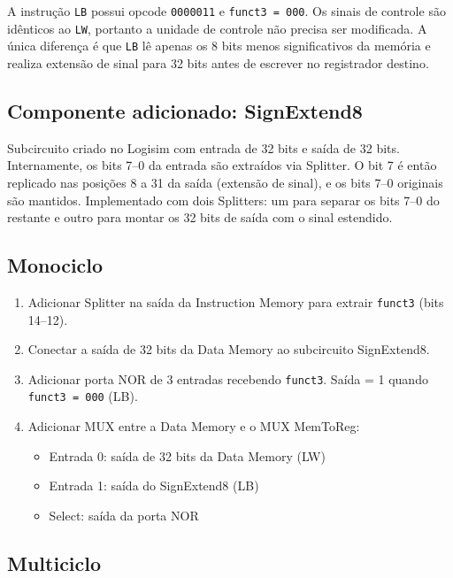 \documentclass{article}
\begin{document}
A instrução \texttt{LB} possui opcode \texttt{0000011} e \texttt{funct3 = 000}. Os sinais de controle são idênticos ao \texttt{LW}, portanto a unidade de controle não precisa ser modificada. A única diferença é que \texttt{LB} lê apenas os 8 bits menos significativos da memória e realiza extensão de sinal para 32 bits antes de escrever no registrador destino.

\subsection*{Componente adicionado: SignExtend8}

Subcircuito criado no Logisim com entrada de 32 bits e saída de 32 bits. Internamente, os bits 7--0 da entrada são extraídos via Splitter. O bit 7 é então replicado nas posições 8 a 31 da saída (extensão de sinal), e os bits 7--0 originais são mantidos. Implementado com dois Splitters: um para separar os bits 7--0 do restante e outro para montar os 32 bits de saída com o sinal estendido.

\subsection*{Monociclo}

\begin{enumerate}
    \item Adicionar Splitter na saída da Instruction Memory para extrair \texttt{funct3} (bits 14--12).
    \item Conectar a saída de 32 bits da Data Memory ao subcircuito SignExtend8.
    \item Adicionar porta NOR de 3 entradas recebendo \texttt{funct3}. Saída = 1 quando \texttt{funct3 = 000} (LB).
    \item Adicionar MUX entre a Data Memory e o MUX MemToReg:
    \begin{itemize}
        \item Entrada 0: saída de 32 bits da Data Memory (LW)
        \item Entrada 1: saída do SignExtend8 (LB)
        \item Select: saída da porta NOR
    \end{itemize}
\end{enumerate}

\subsection*{Multiciclo}
\end{document}
